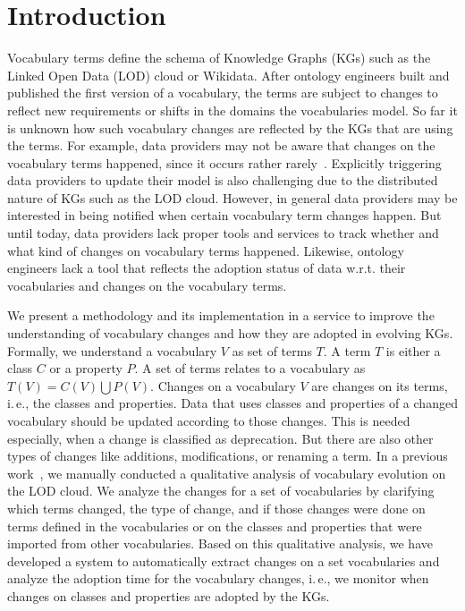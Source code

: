 
\section{Introduction}

Vocabulary terms define the schema of Knowledge Graphs (KGs) such as the Linked Open Data (LOD) cloud or Wikidata.
After ontology engineers built and published the first version of a vocabulary, the terms are subject to changes to reflect new requirements or shifts in the domains the vocabularies model.
So far it is unknown how such vocabulary changes are reflected by the KGs that are using the terms.
For example, data providers may not be aware that changes on the vocabulary terms happened, since it occurs rather rarely~\cite{kafer2013observing}.
Explicitly triggering data providers to update their model is also challenging due to the distributed nature of KGs such as the LOD cloud.
However, in general data providers may be interested in being notified when certain vocabulary term changes happen.
But until today, data providers lack proper tools and services to track whether and what kind of changes on vocabulary terms happened.
Likewise, ontology engineers lack a tool that reflects the adoption status of data w.r.t. their vocabularies and changes on the vocabulary terms.

We present a methodology and its implementation in a service to improve the understanding of vocabulary changes and how they are adopted in evolving KGs.
Formally, we understand a vocabulary $V$ as set of terms $T$. 
A term $T$ is either a class $C$ or a property $P$.
A set of terms relates to a vocabulary as $T(V) = C(V) \bigcup P(V)$.
Changes on a vocabulary $V$ are changes on its terms, i.\,e., the classes and properties.
%
Data that uses classes and properties of a changed vocabulary should be updated according to those changes. 
This is needed especially, when a change is classified as deprecation. 
But there are also other types of changes like additions, modifications, or renaming a term.
In a previous work~\cite{abdel2016qualitative}, we manually conducted a qualitative analysis of vocabulary evolution on the LOD cloud. 
We analyze the changes for a set of vocabularies by clarifying which terms changed, the type of change, and if those changes were done on terms defined in the vocabularies or on the classes and properties that were imported from other vocabularies. Based on this qualitative analysis, we have developed a system to automatically extract changes on a set vocabularies and analyze the adoption time for the vocabulary changes, i.\,e., we monitor when changes on classes and properties are adopted by the KGs. 

